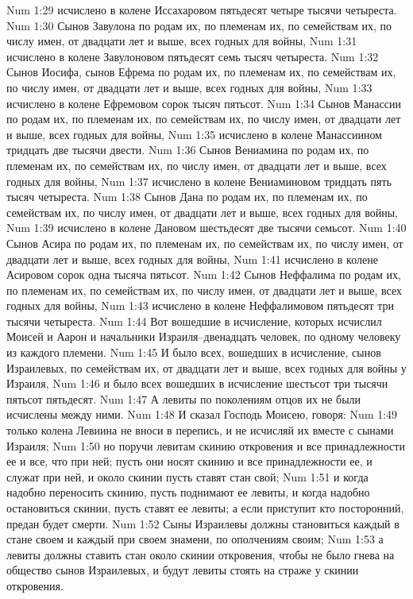 Num 1:29  исчислено в колене Иссахаровом пятьдесят четыре тысячи четыреста.
Num 1:30  Сынов Завулона по родам их, по племенам их, по семействам их, по числу имен, от двадцати лет и выше, всех годных для войны,
Num 1:31  исчислено в колене Завулоновом пятьдесят семь тысяч четыреста.
Num 1:32  Сынов Иосифа, сынов Ефрема по родам их, по племенам их, по семействам их, по числу имен, от двадцати лет и выше, всех годных для войны,
Num 1:33  исчислено в колене Ефремовом сорок тысяч пятьсот.
Num 1:34  Сынов Манассии по родам их, по племенам их, по семействам их, по числу имен, от двадцати лет и выше, всех годных для войны,
Num 1:35  исчислено в колене Манассиином тридцать две тысячи двести.
Num 1:36  Сынов Вениамина по родам их, по племенам их, по семействам их, по числу имен, от двадцати лет и выше, всех годных для войны,
Num 1:37  исчислено в колене Вениаминовом тридцать пять тысяч четыреста.
Num 1:38  Сынов Дана по родам их, по племенам их, по семействам их, по числу имен, от двадцати лет и выше, всех годных для войны,
Num 1:39  исчислено в колене Дановом шестьдесят две тысячи семьсот.
Num 1:40  Сынов Асира по родам их, по племенам их, по семействам их, по числу имен, от двадцати лет и выше, всех годных для войны,
Num 1:41  исчислено в колене Асировом сорок одна тысяча пятьсот.
Num 1:42  Сынов Неффалима по родам их, по племенам их, по семействам их, по числу имен, от двадцати лет и выше, всех годных для войны,
Num 1:43  исчислено в колене Неффалимовом пятьдесят три тысячи четыреста.
Num 1:44  Вот вошедшие в исчисление, которых исчислил Моисей и Аарон и начальники Израиля--двенадцать человек, по одному человеку из каждого племени.
Num 1:45  И было всех, вошедших в исчисление, сынов Израилевых, по семействам их, от двадцати лет и выше, всех годных для войны у Израиля,
Num 1:46  и было всех вошедших в исчисление шестьсот три тысячи пятьсот пятьдесят.
Num 1:47  А левиты по поколениям отцов их не были исчислены между ними.
Num 1:48  И сказал Господь Моисею, говоря:
Num 1:49  только колена Левиина не вноси в перепись, и не исчисляй их вместе с сынами Израиля;
Num 1:50  но поручи левитам скинию откровения и все принадлежности ее и все, что при ней; пусть они носят скинию и все принадлежности ее, и служат при ней, и около скинии пусть ставят стан свой;
Num 1:51  и когда надобно переносить скинию, пусть поднимают ее левиты, и когда надобно остановиться скинии, пусть ставят ее левиты; а если приступит кто посторонний, предан будет смерти.
Num 1:52  Сыны Израилевы должны становиться каждый в стане своем и каждый при своем знамени, по ополчениям своим;
Num 1:53  а левиты должны ставить стан около скинии откровения, чтобы не было гнева на общество сынов Израилевых, и будут левиты стоять на страже у скинии откровения.
